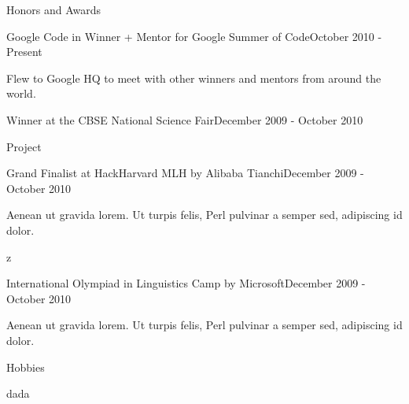 \documentclass[
	a4paper, %
	11pt, %
]{resume} %
\begin{document}
\begin{rSection}{Honors and Awards}

	\begin{achSubsection}{Google Code in Winner + Mentor for Google Summer of Code}{October 2010 - Present}
		\item Flew to Google HQ to meet with other winners and mentors from around the world.
	\end{achSubsection}


	\begin{achSubsection}{Winner at the CBSE National Science Fair}{December 2009 - October 2010}
		\item Project
	\end{achSubsection}


	\begin{achSubsection}{Grand Finalist at HackHarvard MLH by Alibaba Tianchi}{December 2009 - October 2010}
		\item Aenean ut gravida lorem. Ut turpis felis, Perl pulvinar a semper sed, adipiscing id dolor.
	\end{achSubsection}z


	\begin{achSubsection}{International Olympiad in Linguistics Camp by Microsoft}{December 2009 - October 2010}
		\item Aenean ut gravida lorem. Ut turpis felis, Perl pulvinar a semper sed, adipiscing id dolor.
	\end{achSubsection}

\end{rSection}

\begin{rSection}{Hobbies}

	dada


\end{rSection}
\end{document}
